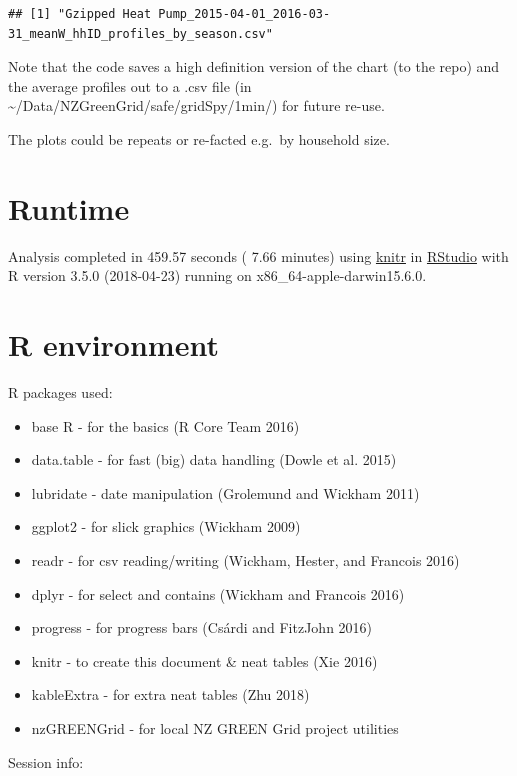 \documentclass[]{article}
\providecommand{\tightlist}{%
  \setlength{\itemsep}{0pt}\setlength{\parskip}{0pt}}
\begin{document}
\begin{verbatim}
## [1] "Gzipped Heat Pump_2015-04-01_2016-03-31_meanW_hhID_profiles_by_season.csv"
\end{verbatim}

Note that the code saves a high definition version of the chart (to the
repo) and the average profiles out to a .csv file (in
\textasciitilde{}/Data/NZGreenGrid/safe/gridSpy/1min/) for future
re-use.

The plots could be repeats or re-facted e.g.~by household size.

\section{Runtime}\label{runtime}

Analysis completed in 459.57 seconds ( 7.66 minutes) using
\href{https://cran.r-project.org/package=knitr}{knitr} in
\href{http://www.rstudio.com}{RStudio} with R version 3.5.0 (2018-04-23)
running on x86\_64-apple-darwin15.6.0.

\section{R environment}\label{r-environment}

R packages used:

\begin{itemize}
\tightlist
\item
  base R - for the basics (R Core Team 2016)
\item
  data.table - for fast (big) data handling (Dowle et al. 2015)
\item
  lubridate - date manipulation (Grolemund and Wickham 2011)
\item
  ggplot2 - for slick graphics (Wickham 2009)
\item
  readr - for csv reading/writing (Wickham, Hester, and Francois 2016)
\item
  dplyr - for select and contains (Wickham and Francois 2016)
\item
  progress - for progress bars (Csárdi and FitzJohn 2016)
\item
  knitr - to create this document \& neat tables (Xie 2016)
\item
  kableExtra - for extra neat tables (Zhu 2018)
\item
  nzGREENGrid - for local NZ GREEN Grid project utilities
\end{itemize}

Session info:
\end{document}
